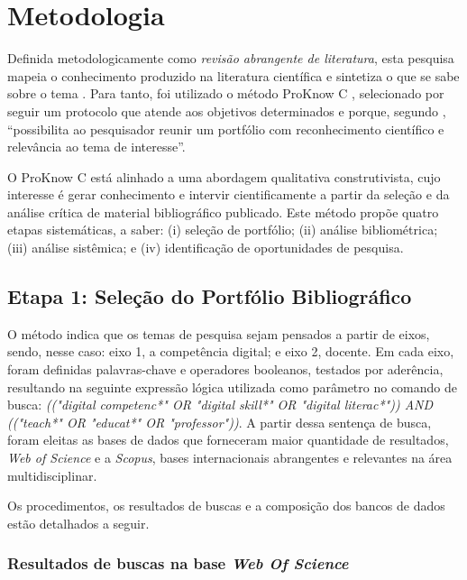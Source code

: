 \documentclass[portuguese]{textolivre}
\begin{document}
\section{Metodologia}

Definida metodologicamente como \textit{revisão abrangente de literatura}, esta pesquisa mapeia o conhecimento produzido na literatura científica e sintetiza o que se sabe sobre o tema \cite{yin_pesquisa_2016}. Para tanto, foi utilizado o método ProKnow C \cite{ensslin_proknow-c_2010}, selecionado por seguir um protocolo que atende aos objetivos determinados e porque, segundo \textcite[p.~56]{linhares_capacidade_2019}, “possibilita ao pesquisador reunir um portfólio com reconhecimento científico e relevância ao tema de interesse”.

O ProKnow C está alinhado a uma abordagem qualitativa construtivista, cujo interesse é gerar conhecimento e intervir cientificamente a partir da seleção e da análise crítica de material bibliográfico publicado. Este método propõe quatro etapas sistemáticas, a saber: (i) seleção de portfólio; (ii) análise bibliométrica; (iii) análise sistêmica; e (iv) identificação de oportunidades de pesquisa.

\subsection{Etapa 1: Seleção do Portfólio Bibliográfico}

O método indica que os temas de pesquisa sejam pensados a partir de eixos, sendo, nesse caso: eixo 1, a competência digital; e eixo 2, docente. Em cada eixo, foram definidas palavras-chave e operadores booleanos, testados por aderência, resultando na seguinte expressão lógica utilizada como parâmetro no comando de busca: \textit{(("digital competenc*" OR "digital skill*" OR "digital literac*")) AND (("teach*" OR "educat*" OR "professor"))}. A partir dessa sentença de busca, foram eleitas as bases de dados que forneceram maior quantidade de resultados, \textit{Web of Science} e a \textit{Scopus}, bases internacionais abrangentes e relevantes na área multidisciplinar.

Os procedimentos, os resultados de buscas e a composição dos bancos de dados estão detalhados a seguir.

\subsubsection{Resultados de buscas na base \textit{Web Of Science}}
\end{document}
